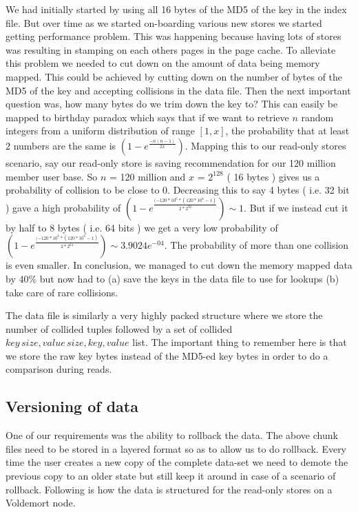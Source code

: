 \documentclass[10pt,twocolumn,preprint,natbib,authoryear]{sigplanconf}
\begin{document}
We had initially started by using all 16 bytes of the MD5 of the key in the index file. But over time as we started on-boarding various new stores we started getting performance problem. This was happening because having lots of stores was resulting in stamping on each others pages in the page cache. To alleviate this problem we needed to cut down on the amount of data being memory mapped. This could be achieved by cutting down on the number of bytes of the MD5 of the key and accepting collisions in the data file. Then the next important question was, how many bytes do we trim down the key to? This can easily be mapped to birthday paradox which says that if we want to retrieve $n$ random integers from a uniform distribution of range $[1, x]$, the probability that at least 2 numbers are the same is  $(1 - e^{\frac{-n(n-1)}{2x}})$. Mapping this to our read-only stores scenario, say our read-only store is saving recommendation for our 120 million member user base. So $n$ = 120 million and $x$ = $2^{128}$ ( 16 bytes ) gives us a probability of collision to be close to 0. Decreasing this to say 4 bytes ( i.e. 32 bit ) gave a high probability of $(1 - e^{\frac{(-120*10^{6} * ( 120*10^{6} - 1)}{2 * 2^{32}}}) \sim 1$. But if we instead cut it by half to 8 bytes ( i.e. 64 bits ) we get a very low probability of $(1 - e^{\frac{(-120*10^{6} * (120*10^{6} - 1)} { 2 * 2^{64}}}) \sim 3.9024e^{-04}$. The probability of more than one collision is even smaller. In conclusion, we managed to cut down the memory mapped data by 40\% but now had to (a) save the keys in the data file to use for lookups (b) take care of rare collisions.

The data file is similarly a very highly packed structure where we store the number of collided tuples followed by a set of collided $key\,size, value\,size, key, value$ list. The important thing to remember here is that we store the raw key bytes instead of the MD5-ed key bytes in order to do a comparison during reads. 



\subsection{Versioning of data}
\label{sec:read_only:versioning}

One of our requirements was the ability to rollback the data. The above chunk files need to be stored in a layered format so as to allow us to do rollback. Every time the user creates a new copy of the complete data-set we need to demote the previous copy to an older state but still keep it around in case of a scenario of rollback. Following is how the data is structured for the read-only stores on a Voldemort node. 
\end{document}
